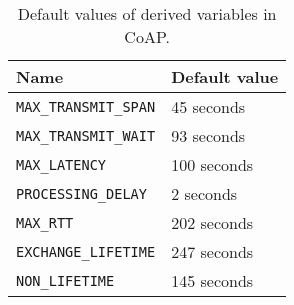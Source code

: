 	\begin{table}[h!]
		\begin{center}
			\begin{tabular}{|l|l|}
				\hline
				\textbf{Name} & \textbf{Default value}\\\hline
				\texttt{MAX\_TRANSMIT\_SPAN} & 45 seconds\\\hline
				\texttt{MAX\_TRANSMIT\_WAIT} & 93 seconds\\\hline
				\texttt{MAX\_LATENCY} & 100 seconds\\\hline
				\texttt{PROCESSING\_DELAY} & 2 seconds\\\hline
				\texttt{MAX\_RTT} & 202 seconds\\\hline
				\texttt{EXCHANGE\_LIFETIME} & 247 seconds\\\hline
				\texttt{NON\_LIFETIME} & 145 seconds\\\hline
			\end{tabular}
			\caption{Default values of derived variables in CoAP.}
			\label{tab:table5}
		\end{center}
	\end{table}	